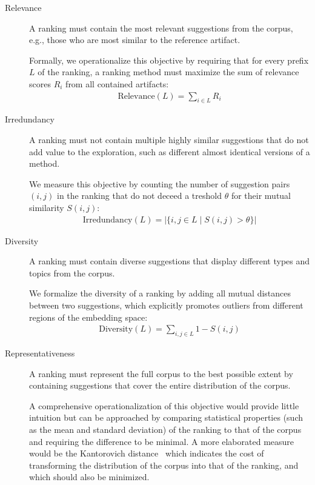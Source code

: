 \begin{description}
	\item[Relevance]
	A ranking must contain the most relevant suggestions from the corpus, e.g., those who are most similar to the reference artifact.

	Formally, we operationalize this objective by requiring that for every prefix $L$ of the ranking, a ranking method must maximize the sum of relevance scores $R_i$ from all contained artifacts:
	\begin{align}
		\text{Relevance}(L) = \sum_{i \in L} R_i
	\end{align}

	\item[Irredundancy]
	A ranking must not contain multiple highly similar suggestions that do not add value to the exploration, such as different almost identical versions of a method.

	We measure this objective by counting the number of suggestion pairs $(i, j)$ in the ranking that do not deceed a treshold $\theta$ for their mutual similarity $S(i, j)$:
	\begin{align}
		\text{Irredundancy}(L) = | \{ i, j \in L \mid S(i, j) > \theta \} |
	\end{align}

	\item[Diversity]
	A ranking must contain diverse suggestions that display different types and topics from the corpus.

	We formalize the diversity of a ranking by adding all mutual distances between two suggestions, which explicitly promotes outliers from different regions of the embedding space:
	\begin{align}
		\text{Diversity}(L) = \sum_{i, j \in L} 1 - S(i, j)
	\end{align}

	\item[Representativeness]
	A ranking must represent the full corpus to the best possible extent by containing suggestions that cover the entire distribution of the corpus.

	A comprehensive operationalization of this objective would provide little intuition but can be approached by comparing statistical properties (such as the mean and standard deviation) of the ranking to that of the corpus and requiring the difference to be minimal.
	A more elaborated measure would be the Kantorovich distance~\cite{vaserstein1969markov} which indicates the cost of transforming the distribution of the corpus into that of the ranking, and which should also be minimized.
\end{description}

